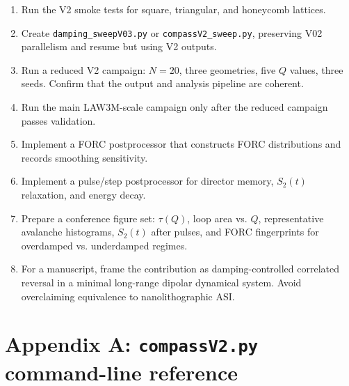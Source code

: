\documentclass[11pt,a4paper]{article}
\newcommand{\code}[1]{\texttt{#1}}
\begin{document}
\begin{enumerate}[leftmargin=*]
\item Run the V2 smoke tests for square, triangular, and honeycomb lattices.
\item Create \code{damping\_sweepV03.py} or \code{compassV2\_sweep.py}, preserving V02 parallelism and resume but using V2 outputs.
\item Run a reduced V2 campaign: $N=20$, three geometries, five $Q$ values, three seeds. Confirm that the output and analysis pipeline are coherent.
\item Run the main LAW3M-scale campaign only after the reduced campaign passes validation.
\item Implement a FORC postprocessor that constructs FORC distributions and records smoothing sensitivity.
\item Implement a pulse/step postprocessor for director memory, $S_2(t)$ relaxation, and energy decay.
\item Prepare a conference figure set: $\tau(Q)$, loop area vs. $Q$, representative avalanche histograms, $S_2(t)$ after pulses, and FORC fingerprints for overdamped vs. underdamped regimes.
\item For a manuscript, frame the contribution as damping-controlled correlated reversal in a minimal long-range dipolar dynamical system. Avoid overclaiming equivalence to nanolithographic ASI.
\end{enumerate}

\section{Appendix A: \code{compassV2.py} command-line reference}
\label{app:cli}
\end{document}
